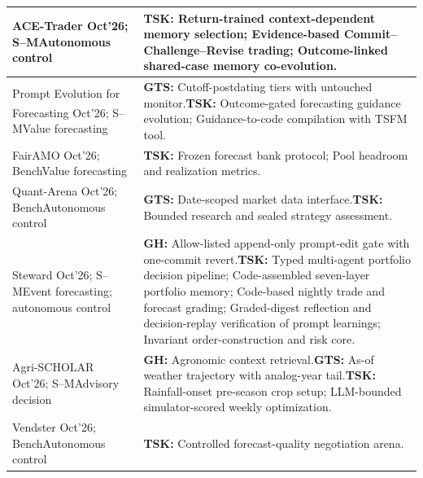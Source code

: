 \documentclass[preprints,article,submit,moreauthors]{Definitions/mdpi}
\newcommand{\typeSMshort}{\textsf{S--M}}
\newcommand{\typeBenchshort}{\textsf{Bench}}
\newcommand{\selfclaim}{\textsuperscript{\dag}}
\begin{document}
\begin{longtable}{@{}>{\raggedright\arraybackslash}p{}p{}@{}}
ACE-Trader \citep{acetrader2026} Oct'26; \typeSMshort{}\newline Autonomous control & \textbf{TSK:} Return-trained context-dependent memory selection; Evidence-based Commit--Challenge--Revise trading; Outcome-linked shared-case memory co-evolution.\\\midrule
Prompt Evolution for Forecasting \citep{promptevolutionforecast2026}\selfclaim{} Oct'26; \typeSMshort{}\newline Value forecasting & \textbf{GTS:} Cutoff-postdating tiers with untouched monitor.\newline\textbf{TSK:} Outcome-gated forecasting guidance evolution; Guidance-to-code compilation with TSFM tool.\\\midrule
FairAMO \citep{fairamo2026} Oct'26; \typeBenchshort{}\newline Value forecasting & \textbf{TSK:} Frozen forecast bank protocol; Pool headroom and realization metrics.\\\midrule
Quant-Arena \citep{quantarena2026} Oct'26; \typeBenchshort{}\newline Autonomous control & \textbf{GTS:} Date-scoped market data interface.\newline\textbf{TSK:} Bounded research and sealed strategy assessment.\\\midrule
Steward \citep{steward2026} Oct'26; \typeSMshort{}\newline Event forecasting; autonomous control & \textbf{GH:} Allow-listed append-only prompt-edit gate with one-commit revert.\newline\textbf{TSK:} Typed multi-agent portfolio decision pipeline; Code-assembled seven-layer portfolio memory; Code-based nightly trade and forecast grading; Graded-digest reflection and decision-replay verification of prompt learnings; Invariant order-construction and risk core.\\\midrule
Agri-SCHOLAR \citep{agrischolar2026} Oct'26; \typeSMshort{}\newline Advisory decision & \textbf{GH:} Agronomic context retrieval.\newline\textbf{GTS:} As-of weather trajectory with analog-year tail.\newline\textbf{TSK:} Rainfall-onset pre-season crop setup; LLM-bounded simulator-scored weekly optimization.\\\midrule
Vendster \citep{vendster2026} Oct'26; \typeBenchshort{}\newline Autonomous control & \textbf{TSK:} Controlled forecast-quality negotiation arena.\\\midrule

\end{longtable}
\end{document}
